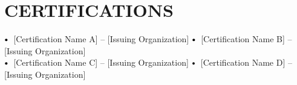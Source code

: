 \documentclass[letterpaper,11pt]{article}
\newcommand\sbullet[1][.5]{\mathbin{\vcenter{\hbox{\scalebox{#1}{$\bullet$}}}}}
\begin{document}
\section{CERTIFICATIONS}
\small{
$\sbullet[.75] \hspace{0.1cm}$ [Certification Name A] -- [Issuing Organization] \hspace{1cm}
$\sbullet[.75] \hspace{0.1cm}$ [Certification Name B] -- [Issuing Organization] \\
$\sbullet[.75] \hspace{0.1cm}$ [Certification Name C] -- [Issuing Organization] \hspace{1cm}
$\sbullet[.75] \hspace{0.1cm}$ [Certification Name D] -- [Issuing Organization]
}
\end{document}
